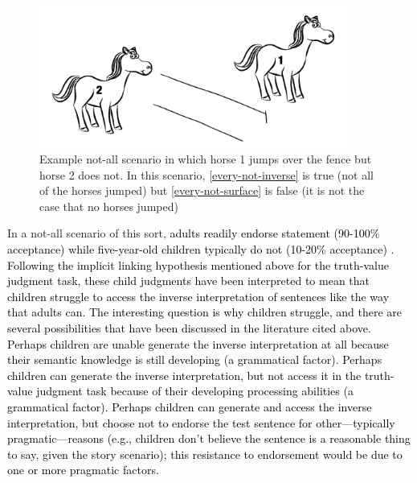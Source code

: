 \documentclass[cm]{glossa}
\newcommand{\lsp}[1]{\textcolor{red}{[lsp: #1]}}
\newcommand{\lp}[1]{\textcolor{black}{#1}} %
\begin{document}
\begin{figure}
    \centering
    \includegraphics[width=4in]{not-all.png}
    \caption{Example not-all scenario in which horse 1 jumps over the fence but horse 2 does not. In this scenario, \ref{every-not-inverse} is true (not all of the horses jumped) but \ref{every-not-surface} is false (it is not the case that no horses jumped)}
    \label{not-all}
\end{figure}

In a not-all scenario of this sort, \lp{adults readily endorse statement \Last 
(90-100\% acceptance)
while five-year-old children typically do not (10-20\% acceptance) \citep{musolino1998,lidzmusolino2002,musolinolidz2006,musolino2006structure,viauetal2010,tieu2015}. }
\lp{Following the implicit linking hypothesis mentioned above for the truth-value judgment task, these child judgments have been interpreted to mean that children struggle to access the inverse interpretation of sentences like \Last the way that adults can.} 
\lp{The interesting question is {why children struggle}, and there are several possibilities that have been discussed in the literature cited above. 
Perhaps children are unable generate the inverse interpretation at all because their semantic knowledge is still developing (a grammatical factor). 
Perhaps children can generate the inverse interpretation, but not access it in the truth-value judgment task because of their developing processing abilities (a grammatical factor).
Perhaps children can generate and access the inverse interpretation, but choose not to endorse the test sentence for other---typically pragmatic---reasons (e.g., children don't believe the sentence is a reasonable thing to say, given the story scenario); this resistance to endorsement would be due to one or more pragmatic factors.
}
\end{document}
